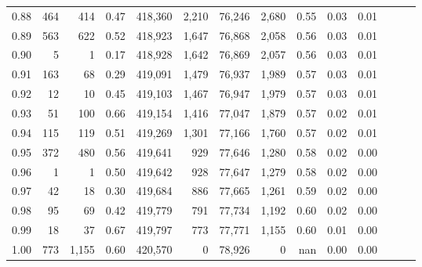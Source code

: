 \begin{tabular}{rrrrrrrrrrrrrr}
0.88 &     464 &    414 &  0.47 &  418,360 &    2,210 &  76,246 &   2,680 &  0.55 &  0.03 &      0.01 \\
0.89 &     563 &    622 &  0.52 &  418,923 &    1,647 &  76,868 &   2,058 &  0.56 &  0.03 &      0.01 \\
0.90 &       5 &      1 &  0.17 &  418,928 &    1,642 &  76,869 &   2,057 &  0.56 &  0.03 &      0.01 \\
0.91 &     163 &     68 &  0.29 &  419,091 &    1,479 &  76,937 &   1,989 &  0.57 &  0.03 &      0.01 \\
0.92 &      12 &     10 &  0.45 &  419,103 &    1,467 &  76,947 &   1,979 &  0.57 &  0.03 &      0.01 \\
0.93 &      51 &    100 &  0.66 &  419,154 &    1,416 &  77,047 &   1,879 &  0.57 &  0.02 &      0.01 \\
0.94 &     115 &    119 &  0.51 &  419,269 &    1,301 &  77,166 &   1,760 &  0.57 &  0.02 &      0.01 \\
0.95 &     372 &    480 &  0.56 &  419,641 &      929 &  77,646 &   1,280 &  0.58 &  0.02 &      0.00 \\
0.96 &       1 &      1 &  0.50 &  419,642 &      928 &  77,647 &   1,279 &  0.58 &  0.02 &      0.00 \\
0.97 &      42 &     18 &  0.30 &  419,684 &      886 &  77,665 &   1,261 &  0.59 &  0.02 &      0.00 \\
0.98 &      95 &     69 &  0.42 &  419,779 &      791 &  77,734 &   1,192 &  0.60 &  0.02 &      0.00 \\
0.99 &      18 &     37 &  0.67 &  419,797 &      773 &  77,771 &   1,155 &  0.60 &  0.01 &      0.00 \\
1.00 &     773 &  1,155 &  0.60 &  420,570 &        0 &  78,926 &       0 &   nan &  0.00 &      0.00 \\
\bottomrule
\end{tabular}
